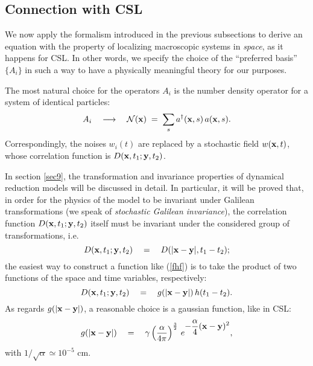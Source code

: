 \documentclass[12pt]{article}
\begin{document}
\subsection{Connection with CSL} \label{nsec5}

We now apply the formalism introduced in the previous subsections
to derive an equation with the property of localizing macroscopic
systems in {\it space}, as it happens for CSL. In other words, we specify
the choice of the ``preferred basis'' $\{ A_{i} \}$ in such a way
to have a physically meaningful theory for our purposes.

The most natural choice for the operators $A_{i}$ is the number
density operator for a system of identical particles:
\begin{equation}
A_{i} \quad \longrightarrow \quad {\mathcal N}({\bf x}) \; = \;
\sum_{s} a^{\dagger}({\bf x}, s)\,a({\bf x}, s).
\end{equation}
Correspondingly, the noises $w_{i}(t)$ are replaced by a
stochastic field $w({\bf x}, t)$, whose correlation function is
$D({\bf x}, t_{1}; {\bf y}, t_{2})$.

In section \ref{sec9}, the transformation and invariance
properties of dynamical reduction models will be discussed in
detail. In particular, it will be proved that, in order for the
physics of the model to be invariant under Galilean
transformations (we speak of {\it stochastic Galilean
invariance}), the correlation function $D({\bf x}, t_{1}; {\bf y},
t_{2})$ itself must be invariant under the considered group of
transformations, i.e.
\begin{equation} \label{fhf}
D({\bf x}, t_{1}; {\bf y}, t_{2}) \quad = \quad D(|{\bf x} - {\bf
y}|, t_{1}- t_{2});
\end{equation}
the easiest way to construct a function like (\ref{fhf}) is to
take the product of two functions of the space and time variables,
respectively:
\begin{equation}
D({\bf x}, t_{1}; {\bf y}, t_{2}) \quad = \quad g(|{\bf x} - {\bf
y}|)\, h(t_{1} - t_{2}).
\end{equation}
As regards $g(|{\bf x} - {\bf y}|)$, a reasonable choice is a
gaussian function, like in CSL:
\begin{equation}
g(|{\bf x} - {\bf y}|) \quad = \quad \gamma
\left(\frac{\alpha}{4\pi}\right)^{\frac{3}{2}}\, e^{\displaystyle
- \frac{\alpha}{4} ({\bf x} - {\bf y})^{2}},
\end{equation}
with $1/\sqrt{\alpha} \simeq 10^{-5}$ cm.
\end{document}
